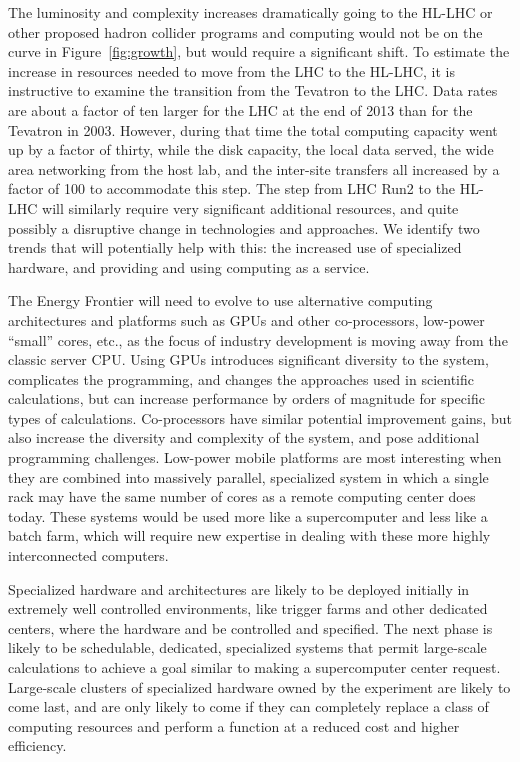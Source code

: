 The luminosity and complexity increases dramatically
going to the HL-LHC or other proposed hadron collider programs
and computing would not be on
the curve in Figure~\ref{fig:growth}, but would require a significant shift.
To estimate the increase in resources needed to move from the LHC to the
HL-LHC, it is instructive to examine the transition from the Tevatron to the
LHC.  Data rates are about a factor of ten larger for the LHC at the end
of 2013 than for the Tevatron in 2003.
However,  during that time the total computing
capacity went up by a factor of thirty, while the disk capacity, the local data
served, the wide area networking from the host lab, and the inter-site
transfers all increased by a factor of 100 to accommodate this step.  The step
from LHC Run2 to the HL-LHC will similarly require very significant additional
resources, and quite possibly a disruptive change in technologies and
approaches.
We identify two trends that will potentially help with this: the
increased use of specialized hardware, and providing and using computing as a
service.

The Energy Frontier will need to evolve to use alternative computing
architectures and platforms such as GPUs and other co-processors,  low-power
``small'' cores, etc., as the focus of industry development is moving away from
the classic server CPU.  Using GPUs introduces significant diversity to the
system, complicates the programming, and changes the approaches used in
scientific calculations, but can increase performance by orders of magnitude
for specific types of calculations.  Co-processors have similar potential
improvement gains, but also increase the diversity and complexity of the
system, and pose additional programming challenges.  Low-power mobile
platforms are most interesting when they are combined into massively parallel,
specialized system in which a single rack 
may have the same number of cores as a
remote computing center does today.  These systems would be used more like a
supercomputer and less like a batch farm, which will require new
expertise in dealing with these more highly interconnected computers.

Specialized hardware and architectures are likely to be deployed initially in
extremely well controlled environments, like trigger farms and other dedicated
centers, where the hardware and be controlled and specified. The next phase is
likely to be schedulable, dedicated, specialized systems that permit large-scale
calculations to achieve a goal similar to making a supercomputer center
request.  Large-scale clusters of specialized hardware owned by the experiment
are likely to come last, and are only likely to come if they can completely
replace a class of computing resources and perform a function at a reduced
cost and higher efficiency.

